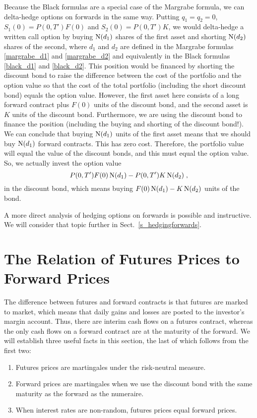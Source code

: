 Because the Black formulas are a special case of the Margrabe formula, we can delta-hedge options on forwards in the same way.  Putting $q_1=q_2=0$, $S_1(0)=P(0,T')F(0)$ and $S_2(0)=P(0,T')K$, we would delta-hedge a written call option by buying $\operatorname{N}(d_1)$ shares of the first asset and shorting $\operatorname{N}(d_2)$ shares of the second, where $d_1$ and $d_2$ are defined in the Margrabe formulas \eqref{margrabe_d1} and \eqref{margrabe_d2} and equivalently in the Black formulas \eqref{black_d1} and \eqref{black_d2}.  This position would be financed by shorting the discount bond to raise the difference between the cost of the portfolio and the option value so that the cost of the total portfolio (including the short discount bond) equals the option value.  However, the first asset here consists of a long forward contract plus $F(0)$ units of the discount bond, and the second asset is $K$ units of the discount bond.  Furthermore, we are using the discount bond to finance the position (including the buying and shorting of the discount bond!).  We can conclude that buying $\operatorname{N}(d_1)$ units of the first asset means that we should buy $\operatorname{N}(d_1)$ forward contracts.  This has zero cost.  Therefore, the portfolio value will equal the value of the discount bonds, and this must equal the option value.  So, we actually invest the option value  
$$P(0,T')F(0)\operatorname{N}(d_1) - P(0,T')K\operatorname{N}(d_2)\; ,$$
in the discount bond, which means buying $F(0)\operatorname{N}(d_1)-K\operatorname{N}(d_2)$ units of the bond.

A more direct analysis of hedging options on forwards is possible and instructive.  We will consider that topic further in Sect.~\ref{s_hedgingforwards}.




\section{The Relation of Futures Prices to Forward Prices}\label{s_futuresforwards}

The difference between futures and forward contracts is that futures are marked to market, which means that daily gains and losses are posted to the investor's margin account.  Thus, there are interim cash flows on a futures contract, whereas the only cash flows on a forward contract are at the maturity of the forward.  We will establish three useful facts in this section, the last of which follows from the first two: 


\begin{enumerate}
\renewcommand{\labelenumi}{(\arabic{enumi})}
\item Futures prices are martingales under the risk-neutral measure. 
\item Forward prices are martingales when we use the discount bond with the same maturity as the forward as the numeraire.
\item When interest rates are non-random, futures prices equal forward prices.
\end{enumerate}


